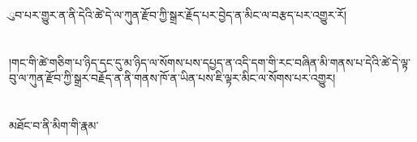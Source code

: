 ུབ་པར་གྱུར་ན་ནི་དེའི་ཚེ་དེ་ལ་ཀུན་རྫོབ་ཀྱི་སྒྲར་རྗོད་པར་བྱེད་ན་མིང་ལ་བརྩད་པར་འགྱུར་རོ།\chapter{ }།གང་གི་ཚེ་གཅིག་པ་ཉིད་དང་དུ་མ་ཉིད་ལ་སོགས་པས་དཔྱད་ན་འདི་དག་གི་རང་བཞིན་མི་གནས་པ་དེའི་ཚེ་དེ་ལྟ་བུ་ལ་ཀུན་རྫོབ་ཀྱི་སྒྲར་བརྗོད་ན་ནི་གནས་ཁོ་ན་ཡིན་པས་ཇི་ལྟར་མིང་ལ་སོགས་པར་འགྱུར།\chapter{ }མཐོང་བ་ནི་མིག་གི་རྣམ་
